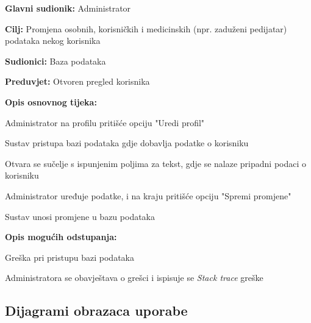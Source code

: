 					\noindent {}
					\begin{packed_item}
						
						\item \textbf{Glavni sudionik: }Administrator
						\item  \textbf{Cilj:} Promjena osobnih, korisničkih i medicinskih (npr. zaduženi pedijatar) podataka nekog korisnika
						\item  \textbf{Sudionici:} Baza podataka
						\item  \textbf{Preduvjet:} Otvoren pregled korisnika
						\item  \textbf{Opis osnovnog tijeka:}
						
						\item[] \begin{packed_enum}
							\item Administrator na profilu pritišće opciju "Uredi profil"
							\item Sustav pristupa bazi podataka gdje dobavlja podatke o korisniku
							\item Otvara se sučelje s ispunjenim poljima za tekst, gdje se nalaze pripadni podaci o korisniku
							\item Administrator uređuje podatke, i na kraju pritišće opciju "Spremi promjene"
							\item Sustav unosi promjene u bazu podataka
						\end{packed_enum}
						\item \textbf{Opis mogućih odstupanja:}
						\item[] \begin{packed_item}
							
							\item[2/5.a] Greška pri pristupu bazi podataka
							\item[] \begin{packed_enum}
								
								\item Administratora se obavještava o grešci i ispisuje se \textit{Stack trace} greške
								
							\end{packed_enum}
						\end{packed_item}
					\end{packed_item}
					\clearpage 
					
				\subsection{Dijagrami obrazaca uporabe}
					
